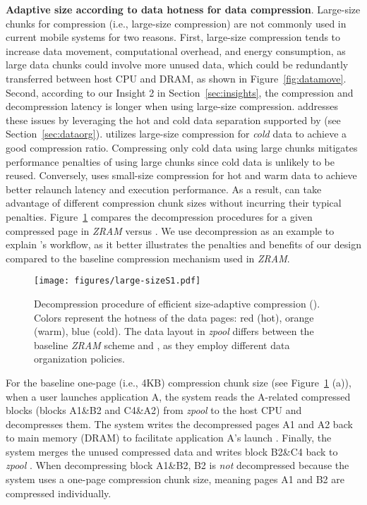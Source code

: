 \noindent\textbf{Adaptive size according to data hotness for data compression}. Large-size chunks for compression (i.e., large-size compression) are not commonly used in current mobile systems for two reasons. 
First, large-size compression tends to increase data movement, computational overhead, and energy consumption, as large data chunks could involve more unused data, which could be redundantly transferred between host CPU and DRAM, as shown in Figure~\ref{fig:datamove}. 
Second, according to our Insight 2 in Section~\ref{sec:insights}, the compression and decompression latency is longer when using large-size compression.
\compress addresses these issues by leveraging the hot and cold data separation supported by \dataorg (see Section~\ref{sec:dataorg}). 
\proposal utilizes large-size compression for \emph{cold} data to achieve a good compression ratio.
Compressing only cold data using large chunks mitigates performance penalties of using large chunks since cold data is unlikely to be reused. 
Conversely, \compress uses small-size compression for hot and warm data to achieve better relaunch latency and execution performance. As a result, \compress can take advantage of different compression chunk sizes without incurring their typical penalties. 
Figure~\ref{fig:large-size} compares the decompression procedures for a given compressed page in \emph{ZRAM} versus \compress. We use decompression as an example to explain \compress's workflow, as it better illustrates the penalties and benefits of our design compared to the baseline compression mechanism used in \emph{ZRAM}.

\begin{figure}[!h]
\centering
\texttt{[image: figures/large-sizeS1.pdf]}
\caption{Decompression procedure of efficient size-adaptive compression (\compress). Colors represent the hotness of the data pages: red (hot), orange (warm), blue (cold). The data layout in \emph{zpool} differs between the baseline \emph{ZRAM} scheme and \proposal, as they employ different data organization policies.}
\label{fig:large-size}
\end{figure}


For the baseline one-page (i.e., 4KB) compression chunk size (see Figure~\ref{fig:large-size} (a)), when a user launches application A, the system reads the A-related compressed blocks (blocks A1\&B2 and C4\&A2) from  \emph{zpool} to the host CPU  and decompresses them. The system writes the decompressed pages A1 and A2 back to main memory (DRAM) to facilitate application A's launch . Finally, the system merges the unused compressed data and writes block B2\&C4 back to  \emph{zpool} .
When decompressing block A1\&B2, B2 is \emph{not} decompressed because the system uses a one-page compression chunk size, meaning pages A1 and B2 are compressed individually.

